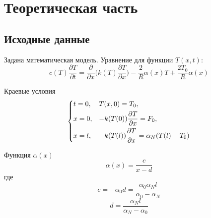 \chapter{Теоретическая часть}\label{theory}

\section{Исходные данные}

Задана математическая модель. Уравнение для функции $T(x, t)$:
\begin{equation}\label{eq:main_t}
    c(T) \frac{\partial T}{\partial t} = \frac{\partial}{\partial x}\Big( k(T) \frac{\partial T}{\partial x} \Big) - \frac{2}{R} \alpha(x) T + \frac{2 T_0}{R} \alpha(x)
\end{equation}

Краевые условия
\begin{equation*}
    \begin{dcases}
        t = 0, & T(x, 0) = T_0, \\
        x = 0, & -k(T(0)) \frac{\partial T}{\partial x} = F_0, \\
        x = l, & -k(T(l)) \frac{\partial T}{\partial x} = \alpha_N(T(l) - T_0)
    \end{dcases}
\end{equation*}

Функция $\alpha (x)$
\begin{equation*}
    \alpha(x) = \frac{c}{x-d}
\end{equation*}
где
\begin{equation*}
    c = -\alpha_0 d = \frac{\alpha_0 \alpha_N l}{\alpha_0 - \alpha_N}
\end{equation*}
\begin{equation*}
    d = \frac{\alpha_N l}{\alpha_N - \alpha_0}
\end{equation*}

